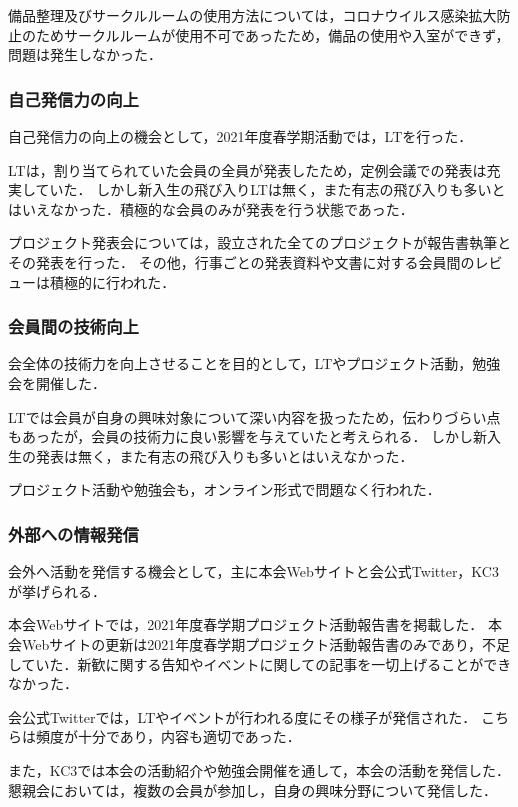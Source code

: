     備品整理及びサークルルームの使用方法については，コロナウイルス感染拡大防止のためサークルルームが使用不可であったため，備品の使用や入室ができず，問題は発生しなかった．

\subsubsection*{自己発信力の向上}
    自己発信力の向上の機会として，2021年度春学期活動では，LTを行った．

    LTは，割り当てられていた会員の全員が発表したため，定例会議での発表は充実していた．
    しかし新入生の飛び入りLTは無く，また有志の飛び入りも多いとはいえなかった．積極的な会員のみが発表を行う状態であった．

    プロジェクト発表会については，設立された全てのプロジェクトが報告書執筆とその発表を行った．
    その他，行事ごとの発表資料や文書に対する会員間のレビューは積極的に行われた．

\subsubsection*{会員間の技術向上}
    会全体の技術力を向上させることを目的として，LTやプロジェクト活動，勉強会を開催した．

    LTでは会員が自身の興味対象について深い内容を扱ったため，伝わりづらい点もあったが，会員の技術力に良い影響を与えていたと考えられる．
    しかし新入生の発表は無く，また有志の飛び入りも多いとはいえなかった．

    プロジェクト活動や勉強会も，オンライン形式で問題なく行われた．

\subsubsection*{外部への情報発信}
    会外へ活動を発信する機会として，主に本会Webサイトと会公式Twitter，KC3が挙げられる．

    本会Webサイトでは，2021年度春学期プロジェクト活動報告書を掲載した．
    本会Webサイトの更新は2021年度春学期プロジェクト活動報告書のみであり，不足していた．新歓に関する告知やイベントに関しての記事を一切上げることができなかった．
    
    会公式Twitterでは，LTやイベントが行われる度にその様子が発信された．
    こちらは頻度が十分であり，内容も適切であった．
    
    また，KC3では本会の活動紹介や勉強会開催を通して，本会の活動を発信した．
    懇親会においては，複数の会員が参加し，自身の興味分野について発信した．
    
